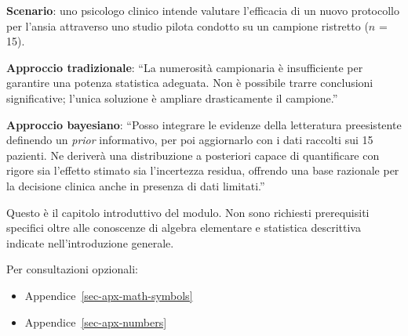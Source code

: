 \documentclass[
  italian,
  letterpaper,
  a4paper,
  11pt,
  open=any]{scrbook}
\providecommand{\tightlist}{%
  \setlength{\itemsep}{0pt}\setlength{\parskip}{0pt}}
\theoremstyle{plain}
\theoremstyle{definition}
\theoremstyle{definition}
\theoremstyle{remark}
\begin{document}
\begin{tcolorbox}[enhanced jigsaw, arc=.35mm, bottomrule=.15mm, bottomtitle=1mm, breakable, colback=white, colbacktitle=quarto-callout-note-color!10!white, colframe=quarto-callout-note-color-frame, coltitle=black, left=2mm, leftrule=.75mm, opacityback=0, opacitybacktitle=0.6, rightrule=.15mm, title=\textcolor{quarto-callout-note-color}{\faInfo}\hspace{0.5em}{Esempio concreto}, titlerule=0mm, toprule=.15mm, toptitle=1mm]

\textbf{Scenario}: uno psicologo clinico intende valutare l'efficacia di
un nuovo protocollo per l'ansia attraverso uno studio pilota condotto su
un campione ristretto (\(n\) = 15).

\textbf{Approccio tradizionale}: ``La numerosità campionaria è
insufficiente per garantire una potenza statistica adeguata. Non è
possibile trarre conclusioni significative; l'unica soluzione è ampliare
drasticamente il campione.''

\textbf{Approccio bayesiano}: ``Posso integrare le evidenze della
letteratura preesistente definendo un \emph{prior} informativo, per poi
aggiornarlo con i dati raccolti sui 15 pazienti. Ne deriverà una
distribuzione a posteriori capace di quantificare con rigore sia
l'effetto stimato sia l'incertezza residua, offrendo una base razionale
per la decisione clinica anche in presenza di dati limitati.''

\end{tcolorbox}

\begin{tcolorbox}[enhanced jigsaw, arc=.35mm, bottomrule=.15mm, bottomtitle=1mm, breakable, colback=white, colbacktitle=quarto-callout-tip-color!10!white, colframe=quarto-callout-tip-color-frame, coltitle=black, left=2mm, leftrule=.75mm, opacityback=0, opacitybacktitle=0.6, rightrule=.15mm, title=\textcolor{quarto-callout-tip-color}{\faLightbulb}\hspace{0.5em}{Prerequisiti}, titlerule=0mm, toprule=.15mm, toptitle=1mm]

Questo è il capitolo introduttivo del modulo. Non sono richiesti
prerequisiti specifici oltre alle conoscenze di algebra elementare e
statistica descrittiva indicate nell'introduzione generale.

Per consultazioni opzionali:

\begin{itemize}
\tightlist
\item
  Appendice~\ref{sec-apx-math-symbols}
\item
  Appendice~\ref{sec-apx-numbers}
\end{itemize}

\end{tcolorbox}
\end{document}
